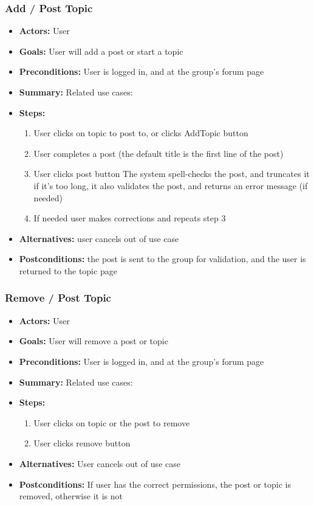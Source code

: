 \documentclass[12pt, oneside, letterpaper]{report}
\begin{document}
			\subsubsection{Add / Post Topic}
			\begin{itemize}
				\item{\textbf{Actors:} User}
				\item{\textbf{Goals:} User will add a post or start a topic}
				\item{\textbf{Preconditions:} User is logged in, and at the group's forum page}
				\item{\textbf{Summary:} Related use cases: }
				\item{\textbf{Steps:}
				\begin{enumerate}
					\item{User clicks on topic to post to, or clicks AddTopic button}
					\item{User completes a post (the default title is the first line of the post)}
					\item{User clicks post button The system spell-checks the post, and truncates it if it's too long, it also validates the post, and returns an error message (if needed)}
					\item{If needed user makes corrections and repeats step 3}
				\end{enumerate}
				}
				\item{\textbf{Alternatives:} user cancels out of use case}
				\item{\textbf{Postconditions:} the post is sent to the group for validation, and the user is returned to the topic page}
			\end{itemize}
			\subsubsection{Remove / Post Topic}
			\begin{itemize}
				\item{\textbf{Actors:} User}
				\item{\textbf{Goals:} User will remove a post or topic}
				\item{\textbf{Preconditions:} User is logged in, and at the group's forum page}
				\item{\textbf{Summary:} Related use cases:}
				\item{\textbf{Steps:}
				\begin{enumerate}
					\item{User clicks on topic or the post to remove}
					\item{User clicks remove button}
				\end{enumerate}
				}
				\item{\textbf{Alternatives:} User cancels out of use case}
				\item{\textbf{Postconditions:} If user has the correct permissions, the post or topic is removed, otherwise it is not}
			\end{itemize}
\end{document}
